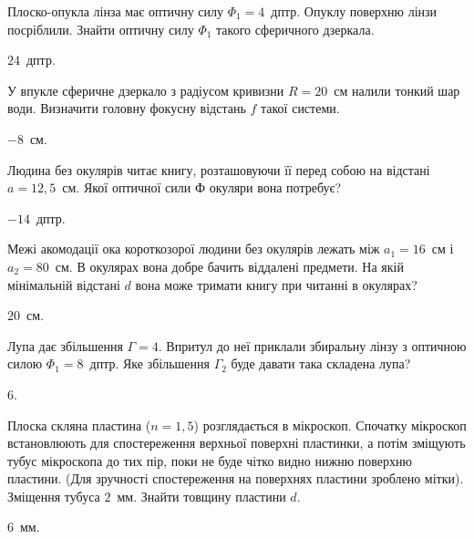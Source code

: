 \begin{problem}%
Плоско-опукла лінза має оптичну силу $\Phi_1 = 4$~дптр. Опуклу
поверхню лінзи посріблили. Знайти оптичну силу $\Phi_1$ такого сферичного
дзеркала.
\begin{solution}
	$24$~дптр.
\end{solution}
\end{problem}


\begin{problem}%
У впукле сферичне дзеркало з радіусом кривизни $R = 20$~см налили
тонкий шар води. Визначити головну фокусну відстань $f$ такої системи.
\begin{solution}
	$-8$~см.
\end{solution}
\end{problem}


\begin{problem}%
Людина без окулярів читає книгу, розташовуючи її перед собою на
відстані $a = 12,5$~см. Якої оптичної сили Ф окуляри вона потребує?
\begin{solution}
	$-14$~дптр.
\end{solution}
\end{problem}


\begin{problem}%
Межі акомодації ока короткозорої людини без окулярів лежать між
$a_1 = 16$~см і $a_2 = 80$~см. В окулярах вона добре бачить віддалені
предмети. На якій мінімальній відстані $d$ вона може тримати книгу при
читанні в окулярах?
\begin{solution}
	$20$~см.
\end{solution}
\end{problem}


\begin{problem}%
Лупа дає збільшення $\Gamma = 4$. Впритул до неї приклали збиральну лінзу
з оптичною силою $\Phi_1 = 8$~дптр. Яке збільшення $\Gamma_2$ буде давати така
складена лупа?
\begin{solution}
	$6$.
\end{solution}
\end{problem}

\begin{problem}%
Плоска скляна пластина ($n = 1,5$) розглядається в мікроскоп. Спочатку мікроскоп встановлюють для спостереження верхньої поверхні пластинки, а потім зміщують тубус мікроскопа до тих пір, поки не буде чітко видно нижню поверхню пластини. (Для зручності спостереження на поверхнях пластини зроблено мітки). Зміщення тубуса $2$~мм. Знайти товщину пластини $d$.
\begin{solution}
	$6$~мм.
\end{solution}
\end{problem}


